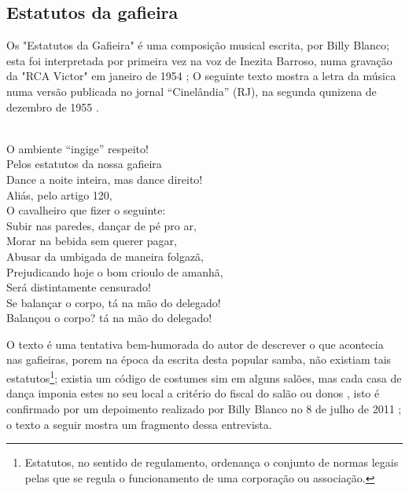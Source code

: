 \subsection{Estatutos da gafieira}
Os "Estatutos da Gafieira" é uma composição musical escrita, por Billy Blanco;
esta foi interpretada por primeira vez na voz de Inezita Barroso, 
numa gravação da "RCA Victor" em janeiro de 1954 \cite{musicaestatuto};
O seguinte texto mostra a letra da música numa 
versão publicada no jornal ``Cinelândia''  (RJ),
na segunda qunizena de dezembro de 1955 \cite[pp. 95]{musicaestatutojournal1955}.
\begin{tcolorbox}[breakable,colback=colorlowgray,colframe=colorlowgray]%
\\
O ambiente ``ingige'' respeito!\\
Pelos estatutos da nossa gafieira\\
Dance a noite inteira, mas dance direito!\\
Aliás, pelo artigo 120,\\
O cavalheiro que fizer o seguinte:\\
Subir nas paredes, dançar de pé pro ar,\\
Morar na bebida sem querer pagar,\\
Abusar da umbigada de maneira folgazã,\\
Prejudicando hoje o bom crioulo de amanhã,\\
Será distintamente censurado!\\
Se balançar o corpo, tá na mão do delegado!\\
Balançou o corpo? tá na mão do delegado!\\
\end{tcolorbox}
O texto é uma tentativa bem-humorada do autor de descrever o que acontecia 
nas gafieiras, porem na época da escrita desta popular samba, não
existiam tais estatutos\footnote{Estatutos, no sentido de regulamento, 
ordenança o conjunto de normas legais pelas que se regula o funcionamento de uma corporação ou associação.};
existia um código de costumes sim \cite[pp. 13]{respeitojournalbrasil1} em alguns salões, 
mas cada casa de dança imponia estes no seu local a critério do fiscal do salão ou donos \cite[pp. 10]{simoesjournalbrasil1} \cite{entrevistajuliojournalbrasil1} \cite[pp. 37]{gafieirajournalmanchete},
isto é confirmado por um depoimento realizado por 
Billy Blanco no 8 de julho de 2011 \cite{depoimentobilly}; o texto a seguir
mostra um fragmento dessa entrevista.

